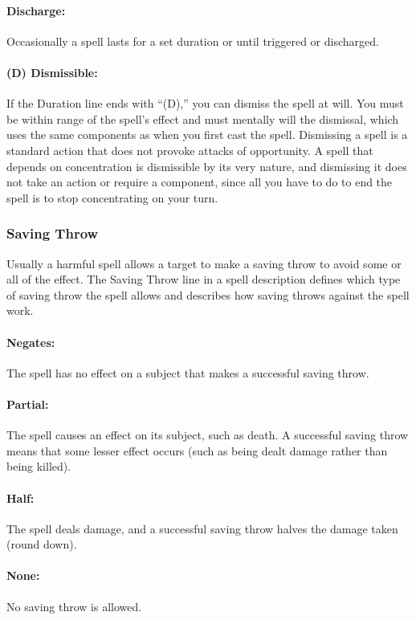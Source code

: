 \documentclass[../VancianToPsionics.tex]{subfiles}
\begin{document}
\paragraph{Discharge:} Occasionally a spell lasts for a set duration or until triggered or discharged.

\paragraph{(D) Dismissible:} If the Duration line ends with ``(D),'' you can dismiss the spell at will. You must be within range of the spell's effect and must mentally will the dismissal, which uses the same components as when you first cast the spell. Dismissing a spell is a standard action that does not provoke attacks of opportunity. A spell that depends on concentration is dismissible by its very nature, and dismissing it does not take an action or require a component, since all you have to do to end the spell is to stop concentrating on your turn.

\subsubsection{Saving Throw}
\label{sec:SavingThrow}
Usually a harmful spell allows a target to make a saving throw to avoid some or all of the effect. 
The Saving Throw line in a spell description defines which type of saving throw the spell allows and describes how saving throws against the spell work.

\paragraph{Negates:} The spell has no effect on a subject that makes a successful saving throw.

\paragraph{Partial:} The spell causes an effect on its subject, such as death. A successful saving throw means that some lesser effect occurs (such as being dealt damage rather than being killed).

\paragraph{Half:} The spell deals damage, and a successful saving throw halves the damage taken (round down). 

\paragraph{None:} No saving throw is allowed.
\end{document}
